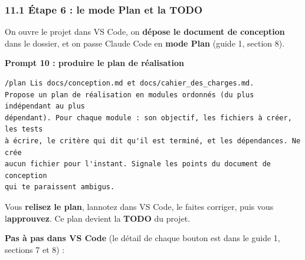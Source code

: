 \documentclass[
  french,
  11pt,
  a4paper,
]{article}
\begin{document}
\subsubsection{11.1 Étape 6 : le mode Plan et la
TODO}\label{111-uxe9tape-6--le-mode-plan-et-la-todo}

On ouvre le projet dans VS Code, on \textbf{dépose le document de
conception} dans le dossier, et on passe Claude Code en \textbf{mode
Plan} (guide 1, section 8).

\textbf{Prompt 10 : produire le plan de réalisation}

\begin{Verbatim}[breaklines=true,breakanywhere=true,fontsize=\small,frame=leftline,framerule=1.6pt,rulecolor=\color{credixblue},framesep=3mm,xleftmargin=2mm,xrightmargin=1mm]
/plan Lis docs/conception.md et docs/cahier_des_charges.md.
Propose un plan de réalisation en modules ordonnés (du plus indépendant au plus
dépendant). Pour chaque module : son objectif, les fichiers à créer, les tests
à écrire, le critère qui dit qu'il est terminé, et les dépendances. Ne crée
aucun fichier pour l'instant. Signale les points du document de conception
qui te paraissent ambigus.
\end{Verbatim}

Vous \textbf{relisez le plan}, l\textquotesingle annotez dans VS Code,
le faites corriger, puis vous l\textquotesingle{}\textbf{approuvez}. Ce
plan devient la \textbf{TODO} du projet.

\textbf{Pas à pas dans VS Code} (le détail de chaque bouton est dans le
guide 1, sections 7 et 8) :
\end{document}
